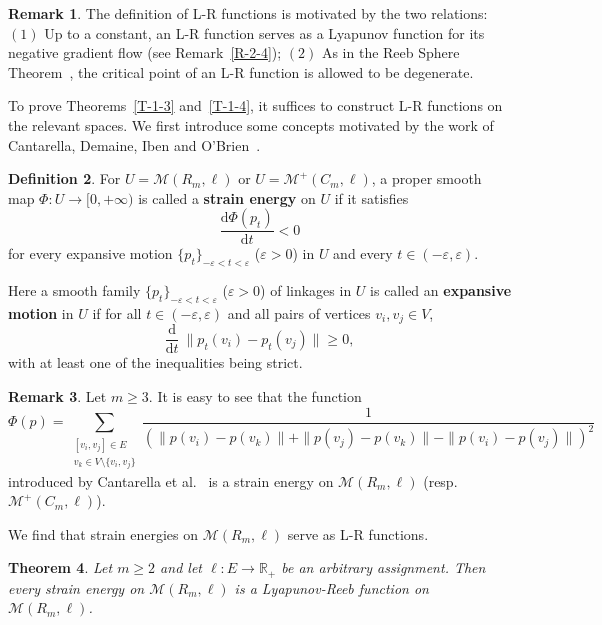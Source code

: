 \documentclass[11pt,letterpaper]{amsart}
\theoremstyle{plain}
\newtheorem{theorem}{Theorem}[section]
\theoremstyle{definition}
\newtheorem{definition}[theorem]{Definition}
\newtheorem{remark}[theorem]{Remark}
\theoremstyle{remark}
\numberwithin{equation}{section}
\begin{document}
\begin{remark}
The definition of L-R functions is motivated by the two relations: $(1)$ Up to a constant, an L-R function serves as a Lyapunov function for its negative gradient flow (see Remark~\ref{R-2-4}); $(2)$ As in the Reeb Sphere Theorem~\cite{Milnor-1964}, the critical point of an L-R function is allowed to be degenerate.
\end{remark}

To prove Theorems~\ref{T-1-3} and~\ref{T-1-4}, it suffices to construct L-R functions on the relevant spaces. We first introduce some concepts motivated by the work of Cantarella, Demaine, Iben and O'Brien~\cite{Cantarella-2004}.

\begin{definition}\label{D-1-9}
For $U=\mathcal M(R_m,\ell)$ or $U=\mathcal M^{+}(C_m,\ell)$,  a proper smooth map $\Phi:U\to[0,+\infty)$ is called a \textbf{strain energy} on $U$ if it satisfies
\[
\frac{\mathrm{d}\Phi(p_t)}{\mathrm{d}t}<0
\]
for every expansive motion $\{p_t\}_{-\varepsilon<t<\varepsilon}$ ($\varepsilon>0$) in $U$ and every $t\in(-\varepsilon,\varepsilon)$.
\end{definition}

Here a smooth family $\{p_t\}_{-\varepsilon<t<\varepsilon}$ ($\varepsilon>0$) of linkages in $U$ is called an \textbf{expansive motion} in $U$  if for all $t\in (-\varepsilon,\varepsilon)$ and
all pairs of vertices $v_i,v_j\in V$,
\[
\frac{\mathrm{d}}{\mathrm{d}t}
~\| p_{t}(v_i)-p_{t}(v_j)\|\geq 0,
\]
with at least one of the inequalities being strict.

\begin{remark}\label{R-1-10}
Let $m\geq 3$. It is easy to see that the function
\[
\Phi(p)=\sum_{\substack{[v_i,v_j]\in E \\ v_k\in V\setminus\{v_i,v_j\}}}\frac{1}
{\left(\|p(v_i)-p(v_k)\|+\|p(v_j)-p(v_k)\|-\|p(v_i)-p(v_j)\|\right)^2}
\]
introduced by Cantarella et al.~\cite{Cantarella-2004} is a strain energy on
$\mathcal M(R_m,\ell)$ (resp. $\mathcal M^{+}(C_m,\ell)$).
\end{remark}

We find that strain energies on $\mathcal M(R_m,\ell)$ serve as L-R functions.

\begin{theorem}\label{T-1-11}
Let $m\geq 2$ and let $\ell:E\to\mathbb R_{+}$ be an arbitrary assignment. Then every strain energy on $\mathcal M(R_m,\ell)$ is a Lyapunov-Reeb function on
$\mathcal M(R_m,\ell)$.
\end{theorem}
\end{document}
